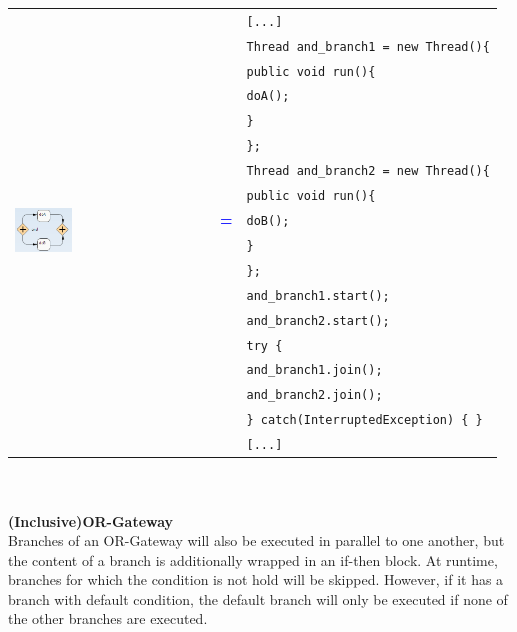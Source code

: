 \begin{tabularx}{\linewidth}{lcX}
	\multirow{18}{*}{\includegraphics[width=0.3\textwidth]{images/mapping/and-gateway.png}} &  & \texttt{[...]}\\
	& & \texttt{Thread and\_branch1 = new Thread()\{}\\
	& & \texttt{\hspace{10pt}public void run()\{}\\
	& & \texttt{\hspace{20pt}doA();}\\
	& & \texttt{\hspace{10pt}\}}\\
	& & \texttt{\};}\\
	& & \texttt{Thread and\_branch2 = new Thread()\{}\\
	& & \texttt{\hspace{10pt}public void run()\{}\\
	& \textbf{\textcolor{blue}{=}} & \texttt{\hspace{20pt}doB();}\\
	& & \texttt{\hspace{10pt}\}}\\
	& & \texttt{\};}\\
	& & \texttt{and\_branch1.start();}\\
	& & \texttt{and\_branch2.start();}\\
	& & \texttt{try \{}\\
	& & \texttt{\hspace{10pt}and\_branch1.join();}\\
	& & \texttt{\hspace{10pt}and\_branch2.join();}\\
	& & \texttt{\} catch(InterruptedException) \{ \}}\\
	& & \texttt{[...]}\\
\end{tabularx}\\\\

\textbf{(Inclusive)OR-Gateway}\\
Branches of an OR-Gateway will also be executed in parallel to one another, but the content of a branch is additionally wrapped in an if-then block. At runtime, branches for which the condition is not hold will be skipped. However, if it has a branch with default condition, the default branch will only be executed if none of the other branches are executed.

